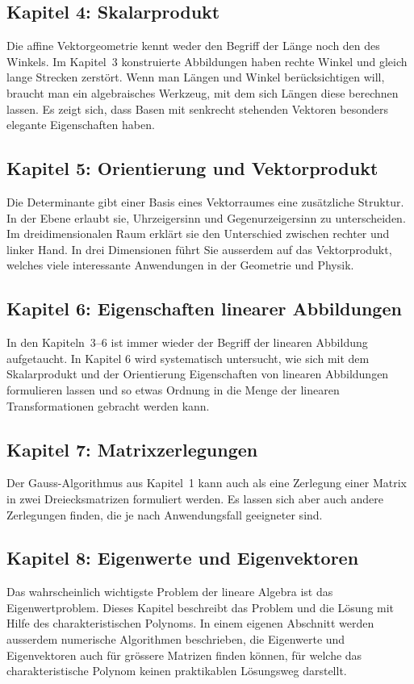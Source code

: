 \subsection*{Kapitel 4: Skalarprodukt}
Die affine Vektorgeometrie kennt weder den Begriff der Länge noch den
des Winkels.
Im Kapitel~3 konstruierte Abbildungen haben rechte Winkel und gleich
lange Strecken zerstört.
Wenn man Längen und Winkel berücksichtigen will, braucht man ein
algebraisches Werkzeug, mit dem sich Längen diese berechnen lassen.
Es zeigt sich, dass Basen mit senkrecht stehenden Vektoren besonders
elegante Eigenschaften haben.

\subsection*{Kapitel 5: Orientierung und Vektorprodukt}
Die Determinante gibt einer Basis eines Vektorraumes eine zusätzliche
Struktur.
In der Ebene erlaubt sie, Uhrzeigersinn und Gegenurzeigersinn zu 
unterscheiden.
Im dreidimensionalen Raum erklärt sie den Unterschied zwischen
rechter und linker Hand.
In drei Dimensionen führt Sie ausserdem auf das Vektorprodukt, welches
viele interessante Anwendungen in der Geometrie und Physik.

\subsection*{Kapitel 6: Eigenschaften linearer Abbildungen}
In den Kapiteln~3--6 ist immer wieder der Begriff der linearen
Abbildung aufgetaucht.
In Kapitel 6 wird systematisch untersucht, wie sich mit dem Skalarprodukt
und der Orientierung Eigenschaften von linearen Abbildungen formulieren
lassen
und so etwas Ordnung in die Menge der linearen Transformationen
gebracht werden kann.

\subsection*{Kapitel 7: Matrixzerlegungen}
Der Gauss-Algorithmus aus Kapitel~1 kann auch als eine
Zerlegung einer Matrix in zwei Dreiecksmatrizen formuliert werden.
Es lassen sich aber auch andere Zerlegungen finden, die je
nach Anwendungsfall geeigneter sind.

\subsection*{Kapitel 8: Eigenwerte und Eigenvektoren}
Das wahrscheinlich wichtigste Problem der lineare Algebra
ist das Eigenwertproblem.
Dieses Kapitel beschreibt das Problem und die Lösung mit Hilfe
des charakteristischen Polynoms.
In einem eigenen Abschnitt werden ausserdem numerische Algorithmen
beschrieben, die Eigenwerte und Eigenvektoren auch für grössere
Matrizen finden können, für welche das charakteristische 
Polynom keinen praktikablen Lösungsweg darstellt.

